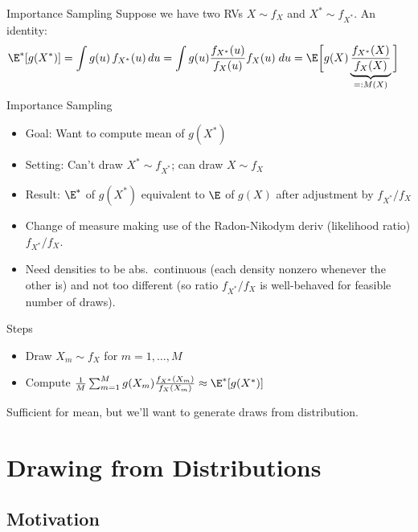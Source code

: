 \documentclass[aspectratio=169, handout]{beamer}
\begin{document}
{\scriptsize
\begin{frame}{Importance Sampling}
Suppose we have two RVs $X\sim f_X$ and $X^*\sim f_{X^*}$.
An identity:
\begin{align*}
  \E^*[g(X^*)]
  &= \int g(u) \, f_{X^*}(u) \, du
  = \int g(u)  \frac{f_{X^*}(u)}{f_X(u)} f_X(u)\;du
  = \E\bigg[g(X)\underbrace{\frac{f_{X^*}(X)}{f_X(X)}}_{=:M(X)}\bigg]
\end{align*}
\alert{Importance Sampling}
\begin{itemize}
  \item \alert{Goal}: Want to compute mean of $g(X^*)$
  \item \alert{Setting}: Can't draw $X^*\sim f_{X^*}$; can draw $X\sim f_X$
  \item \alert{Result}:
    $\E^*$ of $g(X^*)$ equivalent to $\E$ of $g(X)$ after
    \alert{adjustment} by $f_{X^*}/f_X$
  \item \alert{Change of measure} making use of the
    Radon-Nikodym deriv (likelihood ratio) $f_{X^*}/f_X$.
  \item Need densities to be \alert{abs.\ continuous} (each
    density nonzero whenever the other is) and not too different
    (so ratio $f_{X^*}/f_X$ is well-behaved for feasible number of
    draws).
\end{itemize}
\vspace{-8pt}
Steps
\vspace{-8pt}
\begin{itemize}
  \item Draw $X_m \sim f_X$
    for $m=1,\ldots,M$
  \item Compute
    $\frac{1}{M}\sum_{m=1}^M g(X_m)
    \frac{f_{X^*}(X_m)}{f_X(X_m)}\approx \E^*[g(X^*)]$
\end{itemize}
Sufficient for \alert{mean}, but we'll want to generate \alert{draws}
from distribution.
\end{frame}
}


\section{Drawing from Distributions}

\subsection{Motivation}
\end{document}
